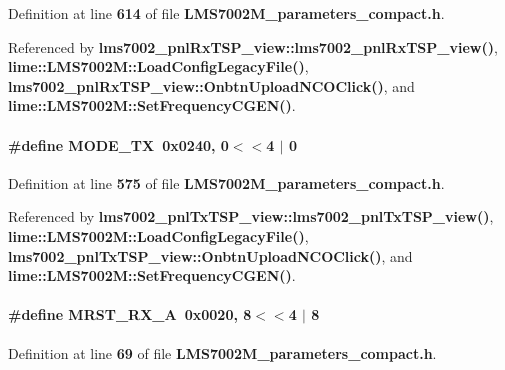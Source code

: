 Definition at line {\bf 614} of file {\bf L\+M\+S7002\+M\+\_\+parameters\+\_\+compact.\+h}.



Referenced by {\bf lms7002\+\_\+pnl\+Rx\+T\+S\+P\+\_\+view\+::lms7002\+\_\+pnl\+Rx\+T\+S\+P\+\_\+view()}, {\bf lime\+::\+L\+M\+S7002\+M\+::\+Load\+Config\+Legacy\+File()}, {\bf lms7002\+\_\+pnl\+Rx\+T\+S\+P\+\_\+view\+::\+Onbtn\+Upload\+N\+C\+O\+Click()}, and {\bf lime\+::\+L\+M\+S7002\+M\+::\+Set\+Frequency\+C\+G\+E\+N()}.

\paragraph[{M\+O\+D\+E\+\_\+\+TX}]{\setlength{\rightskip}{0pt plus 5cm}\#define M\+O\+D\+E\+\_\+\+TX~0x0240, 0$<$$<$4 $\vert$  0}\label{LMS7002M__parameters__compact_8h_a77e098c32c4c29fe83f5c0010c70c146}


Definition at line {\bf 575} of file {\bf L\+M\+S7002\+M\+\_\+parameters\+\_\+compact.\+h}.



Referenced by {\bf lms7002\+\_\+pnl\+Tx\+T\+S\+P\+\_\+view\+::lms7002\+\_\+pnl\+Tx\+T\+S\+P\+\_\+view()}, {\bf lime\+::\+L\+M\+S7002\+M\+::\+Load\+Config\+Legacy\+File()}, {\bf lms7002\+\_\+pnl\+Tx\+T\+S\+P\+\_\+view\+::\+Onbtn\+Upload\+N\+C\+O\+Click()}, and {\bf lime\+::\+L\+M\+S7002\+M\+::\+Set\+Frequency\+C\+G\+E\+N()}.

\paragraph[{M\+R\+S\+T\+\_\+\+R\+X\+\_\+A}]{\setlength{\rightskip}{0pt plus 5cm}\#define M\+R\+S\+T\+\_\+\+R\+X\+\_\+A~0x0020, 8$<$$<$4 $\vert$  8}\label{LMS7002M__parameters__compact_8h_a37529b82b4fbd51cd70d0c5f7fdefedc}


Definition at line {\bf 69} of file {\bf L\+M\+S7002\+M\+\_\+parameters\+\_\+compact.\+h}.



